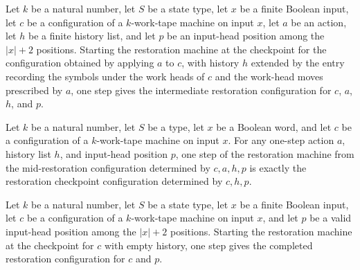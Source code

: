 \begin{lemma}
\label{Complexity.enumCont_undo_back}
\leanok
{}
Let $k$ be a natural number, let $S$ be a state type, let $x$ be a finite Boolean input,
let $c$ be a configuration of a $k$-work-tape machine on input $x$, let $a$ be an
action, let $h$ be a finite history list, and let $p$ be an input-head position among
the $|x|+2$ positions. Starting the restoration machine at the checkpoint for the
configuration obtained by applying $a$ to $c$, with history $h$ extended by the entry
recording the symbols under the work heads of $c$ and the work-head moves prescribed by
$a$, one step gives the intermediate restoration configuration for $c$, $a$, $h$, and
$p$.
\end{lemma}

\begin{lemma}
\label{Complexity.enumCont_undo_write}
\leanok
{}
Let $k$ be a natural number, let $S$ be a type, let $x$ be a Boolean word, and let $c$
be a configuration of a $k$-work-tape machine on input $x$. For any one-step action $a$,
history list $h$, and input-head position $p$, one step of the restoration machine from
the mid-restoration configuration determined by $c,a,h,p$ is exactly the restoration
checkpoint configuration determined by $c,h,p$.
\end{lemma}

\begin{lemma}
\label{Complexity.enumCont_undo_empty}
\leanok
{}
Let $k$ be a natural number, let $S$ be a state type, let $x$ be a finite Boolean input,
let $c$ be a configuration of a $k$-work-tape machine on input $x$, and let $p$ be a
valid input-head position among the $|x|+2$ positions. Starting the restoration machine
at the checkpoint for $c$ with empty history, one step gives the completed restoration
configuration for $c$ and $p$.
\end{lemma}

